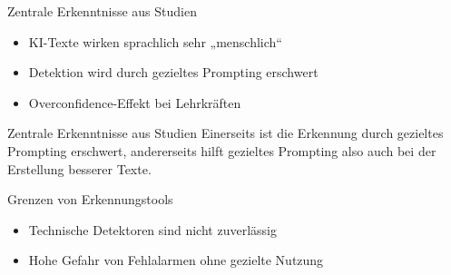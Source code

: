 \documentclass[14pt, aspectratio=169]{beamer}
\begin{document}
\begin{frame}{Zentrale Erkenntnisse aus Studien}
\begin{itemize}
    \item KI-Texte wirken sprachlich sehr „menschlich“
    \item Detektion wird durch gezieltes Prompting erschwert
    \item Overconfidence-Effekt bei Lehrkräften
\end{itemize}
\end{frame}

\begin{frame}{Zentrale Erkenntnisse aus Studien}
 \Large Einerseits ist die Erkennung durch gezieltes Prompting erschwert,
 \vspace{0.3cm}
 \Large andererseits hilft gezieltes Prompting also auch bei der Erstellung besserer Texte.
\end{frame}

\begin{frame}{Grenzen von Erkennungstools}
\begin{itemize}
    \item Technische Detektoren sind nicht zuverlässig
    \item Hohe Gefahr von Fehlalarmen ohne gezielte Nutzung
\end{itemize}
\end{frame}

%
%
%
\end{document}
